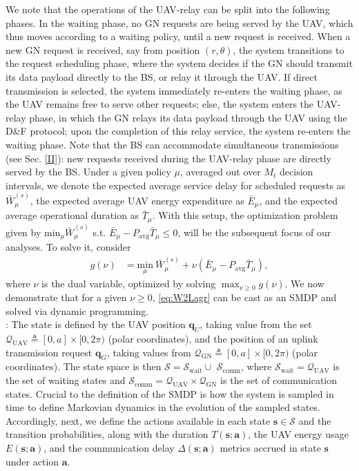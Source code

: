 \documentclass[10pt,twocolumn]{IEEEtran}
\begin{document}
We note that the operations of the UAV-relay can be split into the following phases. In the waiting phase, no GN requests are being served by the UAV, which thus moves according to a waiting policy, until a new request is received. When a new GN request is received, say from position $(r,\theta)$, the system transitions to the request scheduling phase, where the system decides if the GN should transmit its data payload directly to the BS, or relay it through the UAV. If direct transmission is selected, the system immediately re-enters the waiting phase, as the UAV remains free to serve other requests; else, the system enters the UAV-relay phase, in which the GN relays its data payload through the UAV using the D\&F protocol; upon the completion of this relay service, the system re-enters the waiting phase. Note that the BS can accommodate simultaneous transmissions (see Sec. \ref{II}): new requests received during the UAV-relay phase are directly served by the BS. Under a given policy $\mu$, averaged out over $M_{t}$ decision intervals, we denote the expected average service delay for scheduled requests as $\bar{W}_{\mu}^{(s)}$, the expected average UAV energy expenditure as $\bar{E}_{\mu}$, and the expected average operational duration as $\bar{T}_{\mu}$. With this setup, the optimization problem given by ${\mathrm{min}}_{\mu}\bar{W}_{\mu}^{(s)}$ s.t. $\bar{E}_{\mu}{-}P_{\mathrm{avg}}\bar{T}_{\mu}{\leq}0$, will be the subsequent focus of our analyses. To solve it, consider
\begin{align}\label{eq:W2Lagr}
    g(\nu)&{=}\underset{\mu}{\mathrm{min}}\ \bar{W}_{\mu}^{(s)} + \nu (\bar{E}_{\mu}-P_{\mathrm{avg}}\bar{T}_{\mu}),
\end{align}
where $\nu$ is the dual variable, optimized by solving $\max_{\nu{\geq}0}g(\nu)$. We now demonstrate that for a given $\nu{\geq}0$, \eqref{eq:W2Lagr} can be cast as an SMDP and solved via dynamic programming.\\
: The state is defined by the UAV position $\mathbf{q}_{U}$, taking value from the set $\mathcal{Q}_{\mathrm{UAV}}\triangleq[0,a]\times[0,2\pi)$ (polar coordinates), and the position of an uplink transmission request $\mathbf{q}_G$, taking values from $\mathcal{Q}_{\mathrm{GN}}{\triangleq}[0,a]{\times}[0,2\pi)$ (polar coordinates). The state space is then $\mathcal{S}{=}\mathcal{S}_{\mathrm{wait}}{\cup}$ $\mathcal{S}_{\mathrm{comm}}$, where $\mathcal{S}_{\mathrm{wait}}{=}\mathcal{Q}_{\mathrm{UAV}}$ is the set of waiting states and $\mathcal{S}_{\mathrm{comm}}{=}\mathcal{Q}_{\mathrm{UAV}}{\times}\mathcal{Q}_{\mathrm{GN}}$ is the set of communication states. Crucial to the definition of the SMDP is how the system is sampled in time to define Markovian dynamics in the evolution of the sampled states. Accordingly, next, we define the actions available in each state $\mathbf{s}{\in}\mathcal{S}$ and the transition probabilities, along with the duration $T(\mathbf{s};\mathbf{a})$, the UAV energy usage $E(\mathbf{s};\mathbf{a})$, and the communication delay $\Delta(\mathbf{s};\mathbf{a})$ metrics accrued in state $\mathbf{s}$ under action $\mathbf{a}$.\\
\end{document}
